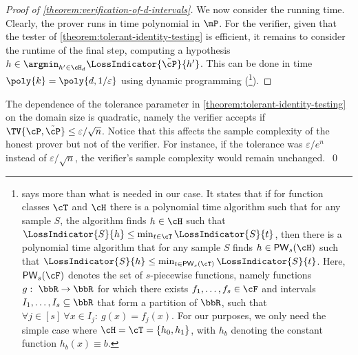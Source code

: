 \documentclass{toc}
\begin{document}
\begin{proof}[Proof of \cref{theorem:verification-of-d-intervals}]
	We now consider %
the running time.  %
Clearly, the prover runs in time polynomial in $\mP$. For the verifier, given that the tester of \cref{theorem:tolerant-identity-testing} is efficient, it remains to consider the runtime of the final step, computing a hypothesis $h \in \argmin_{h' \in \cH_d} \LossIndicator{\tilde{\cP}}{h'}$. This can be done in time $\poly{k} = \poly{d, 1/\varepsilon}$ using dynamic programming %
(\cite[Theorem 4]{DBLP:journals/ml/KearnsSS94}\footnote{%
%
%
\cite[Theorem 4]{DBLP:journals/ml/KearnsSS94}  %
%
says more than what is needed in our case. It states that if for function classes $\cT$ and $\cH$ there is a polynomial time algorithm such that for any sample $S$, the algorithm finds $h \in \cH$ such that $\LossIndicator{S}{h} \leq \min_{t \in \cT}\LossIndicator{S}{t}$, then there is a polynomial time algorithm that for any sample $S$ finds $h \in \mathsf{PW}_s(\cH)$ such that $\LossIndicator{S}{h} \leq \min_{t \in \mathsf{PW}_s(\cT)}\LossIndicator{S}{t}$. Here, $\mathsf{PW}_s(\cF)$ denotes the set of $s$-piecewise functions, namely functions $g: ~ \bbR \to \bbR$ for which there exists $f_1,\dots,f_s \in \cF$ and intervals $I_1,\dots,I_s \subseteq \bbR$ that form a partition of $\bbR$, such that $\forall j \in [s] ~ \forall x \in I_j: ~ g(x) = f_j(x)$. For our purposes, we only need the simple case where $\cH = \cT = \{h_0,h_1\}$, with $h_b$ denoting the constant function $h_b(x) \equiv b$.%
	}).
\end{proof}

%

\begin{remark}
	The dependence of the tolerance parameter in \cref{theorem:tolerant-identity-testing} on the domain size is quadratic, namely the verifier accepts if $\TV{\cP,\tilde{\cP}} \leq \varepsilon/\sqrt{n}$. Notice that this affects the sample complexity of the honest prover but not of the verifier. For instance, if the tolerance was $\varepsilon/e^n$ instead of $\varepsilon/\sqrt{n}$, the verifier's sample complexity would remain unchanged.~\qed
\end{remark}

%

%
\end{document}
